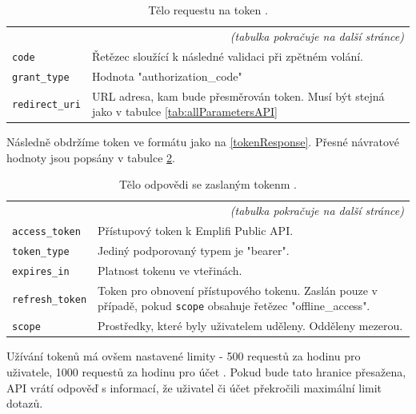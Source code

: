 \documentclass[czech, bc, kiv, he, iso690numb]{fasthesis}
\begin{document}
\begin{center}
	\begin{longtable}{p{}p{}}
	\caption{Tělo requestu na token \cite{emplifiDocs}.}
	\label{tab:exampleRequestBody}\\
	\toprule[1.5pt]
	\endhead
	\midrule
	\multicolumn{2}{r}{\textit{(tabulka pokračuje na další stránce)}}\\
	\endfoot
	\bottomrule[1.5pt]
	\endlastfoot
	\verb"code" & Řetězec sloužící k následné validaci při zpětném volání. \\
	\midrule
	\verb"grant_type" & Hodnota "authorization\_code" \\
	\midrule
	\verb"redirect_uri" & URL adresa, kam bude přesměrován token. Musí být stejná jako v tabulce \ref{tab:allParametersAPI} \\
	\end{longtable}
\end{center}

Následně obdržíme token ve formátu jako na \ref{tokenResponse}. Přesné návratové hodnoty jsou popsány v tabulce \ref{tab:exampleRequestResponse}.

\begin{center}
	\begin{longtable}{p{}p{}}
	\caption{Tělo odpovědi se zaslaným tokenm \cite{emplifiDocs}.}
	\label{tab:exampleRequestResponse}\\
	\toprule[1.5pt]
	\endhead
	\midrule
	\multicolumn{2}{r}{\textit{(tabulka pokračuje na další stránce)}}\\
	\endfoot
	\bottomrule[1.5pt]
	\endlastfoot
	\verb"access_token" & Přístupový token k Emplifi Public API. \\
	\midrule
	\verb"token_type" & Jediný podporovaný typem je "bearer". \\
	\midrule
	\verb"expires_in" & Platnost tokenu ve vteřinách. \\
	\midrule
	\verb"refresh_token" & Token pro obnovení přístupového tokenu. Zaslán pouze v případě, pokud \verb"scope" obsahuje řetězec "offline\_access".\\
	\midrule
	\verb"scope" & Prostředky, které byly uživatelem uděleny. Odděleny mezerou. \\
	\end{longtable}
\end{center}



Užívání tokenů má ovšem nastavené limity - 500 requestů za hodinu pro uživatele, 1000 requestů za hodinu pro účet \cite{emplifiDocs}. Pokud bude tato hranice přesažena,
API vrátí odpověď s informací, že uživatel či účet překročili maximální limit dotazů.
\end{document}
